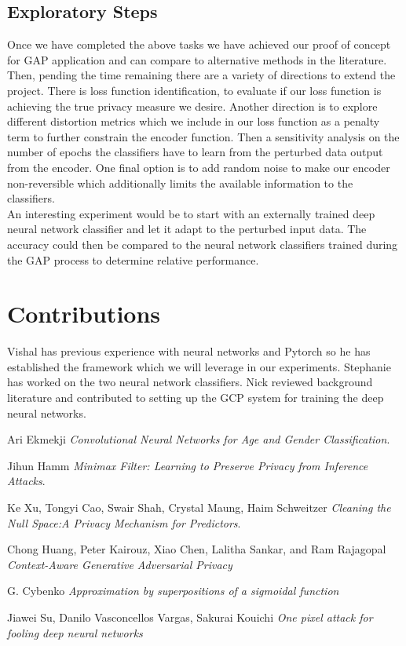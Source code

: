 \documentclass[10pt,twocolumn,letterpaper]{article}
\begin{document}
\subsection{Exploratory Steps}
Once we have completed the above tasks we have achieved our proof of concept for GAP application and can compare to alternative methods in the literature. Then, pending the time remaining there are a variety of directions to extend the project. There is loss function identification, to evaluate if our loss function is achieving the true privacy measure we desire. Another direction is to explore different distortion metrics which we include in our loss function as a penalty term to further constrain the encoder function. Then a sensitivity analysis on the number of epochs the classifiers have to learn from the perturbed data output from the encoder. One final option is to add random noise to make our encoder non-reversible which additionally limits the available information to the classifiers. \\
 

An interesting experiment would be to start with an externally trained deep neural network classifier and let it adapt to the perturbed input data. The accuracy could then be compared to the neural network classifiers trained during the GAP process to determine relative performance. 
\section{Contributions}
Vishal has previous experience with neural networks and Pytorch so he has established the framework which we will leverage in our experiments.
Stephanie has worked on the two neural network classifiers. 
Nick reviewed background literature and contributed to setting up the GCP system for training the deep neural networks.

\begin{thebibliography}{9}
Ari Ekmekji
\textit{Convolutional Neural Networks for Age and Gender Classification}. 

Jihun Hamm
\textit{Minimax Filter: Learning to Preserve Privacy from Inference Attacks}. 

Ke Xu, Tongyi Cao, Swair Shah, Crystal Maung, Haim Schweitzer
\textit{Cleaning the Null Space:A Privacy Mechanism for Predictors}. 

Chong Huang, Peter Kairouz, Xiao Chen, Lalitha Sankar, and Ram Rajagopal
\textit{Context-Aware Generative Adversarial Privacy}

G. Cybenko
\textit{Approximation by superpositions of a sigmoidal function}

Jiawei Su, Danilo Vasconcellos Vargas, Sakurai Kouichi
\textit{One pixel attack for fooling deep neural networks}

\end{thebibliography}
\end{document}
